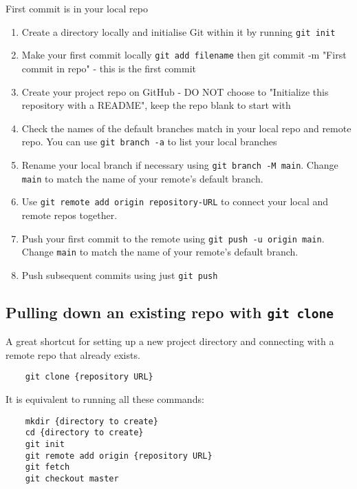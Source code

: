 \begin{infobox}{First commit is in your local repo}

	\begin{enumerate}
		\item Create a directory locally and initialise Git within it by running \texttt{git init}
		\item Make your first commit locally \texttt{git add {filename}} then {git commit -m "First commit in repo"} - this is the first commit
		\item Create your project repo on GitHub - DO NOT choose to "Initialize this repository with a README", keep the repo blank to start with
		\item Check the names of the default branches match in your local repo and remote repo. You can use \texttt{git branch -a} to list your local branches
		\item Rename your local branch if necessary using \texttt{git branch -M main}. Change \texttt{main} to match the name of your remote's default branch.
		\item Use \texttt{git remote add origin {repository-URL}} to connect your local and remote repos together.
		\item Push your first commit to the remote using \texttt{git push -u origin main}. Change \texttt{main} to match the name of your remote's default branch.
		\item Push subsequent commits using just \texttt{git push}
	\end{enumerate}
\end{infobox}


\subsection{Pulling down an existing repo with \texttt{git clone}}

A great shortcut for setting up a new project directory and connecting with a remote repo that already exists.
\\

\begin{verbatim}
    git clone {repository URL}
\end{verbatim}

It is equivalent to running all these commands:

\begin{verbatim}
    mkdir {directory to create}
    cd {directory to create}
    git init
    git remote add origin {repository URL}
    git fetch
    git checkout master
\end{verbatim}

